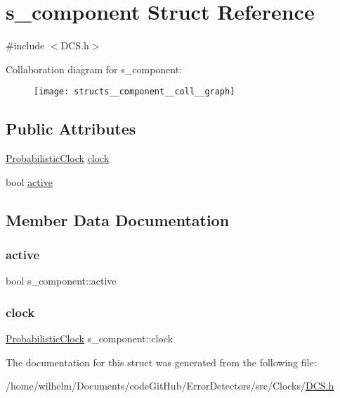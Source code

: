 \hypertarget{structs__component}{}\section{s\+\_\+component Struct Reference}
\label{structs__component}


{\ttfamily \#include $<$D\+C\+S.\+h$>$}



Collaboration diagram for s\+\_\+component\+:
\nopagebreak
\begin{figure}[H]
\begin{center}
\leavevmode
\texttt{[image: structs\_\_component\_\_coll\_\_graph]}
\end{center}
\end{figure}
\subsection*{Public Attributes}
\begin{DoxyCompactItemize}
\item 
\hyperlink{class_probabilistic_clock}{Probabilistic\+Clock} \hyperlink{structs__component_a04be4e47e632b250bae7270fb70852e5}{clock}
\item 
bool \hyperlink{structs__component_a1ecdd5d1eed4c897ad2ae8b4e137e58a}{active}
\end{DoxyCompactItemize}


\subsection{Member Data Documentation}
\mbox{\label{structs__component_a1ecdd5d1eed4c897ad2ae8b4e137e58a}} 
\subsubsection{\texorpdfstring{active}{active}}
{\footnotesize\ttfamily bool s\+\_\+component\+::active}

\mbox{\label{structs__component_a04be4e47e632b250bae7270fb70852e5}} 
\subsubsection{\texorpdfstring{clock}{clock}}
{\footnotesize\ttfamily \hyperlink{class_probabilistic_clock}{Probabilistic\+Clock} s\+\_\+component\+::clock}



The documentation for this struct was generated from the following file\+:\begin{DoxyCompactItemize}
\item 
/home/wilhelm/\+Documents/code\+Git\+Hub/\+Error\+Detectors/src/\+Clocks/\hyperlink{_d_c_s_8h}{D\+C\+S.\+h}\end{DoxyCompactItemize}
